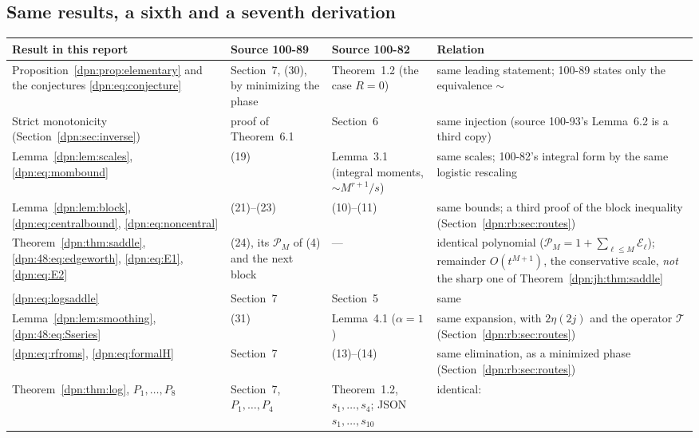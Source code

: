 \documentclass[11pt]{article}
\numberwithin{equation}{section}
\theoremstyle{definition}\newtheorem{definition}[theorem]{Definition}
\theoremstyle{remark}\newtheorem{remark}[theorem]{Remark}
\newcommand{\Top}{\mathcal T}
\begin{document}
\subsection{Same results, a sixth and a seventh derivation}\label{dpn:rb:sec:dup}
\begin{table}[!htbp]
\centering\small
\begin{tabular}{>{\raggedright\arraybackslash}p{3.7cm}>{\raggedright\arraybackslash}p{2.9cm}>{\raggedright\arraybackslash}p{2.9cm}>{\raggedright\arraybackslash}p{4.0cm}}
\toprule
Result in this report & Source 100-89 & Source 100-82 & Relation\\
\midrule
Proposition~\ref{dpn:prop:elementary} and the conjectures
 \eqref{dpn:eq:conjecture} & Section~7, (30), by minimizing the phase &
 Theorem~1.2 (the case $R=0$) & same leading statement; 100-89 states only
 the equivalence $\sim$\\
Strict monotonicity (Section~\ref{dpn:sec:inverse}) & proof of Theorem~6.1 &
 Section~6 & same injection (source 100-93's Lemma~6.2 is a third copy)\\
Lemma~\ref{dpn:lem:scales}, \eqref{dpn:eq:mombound} & (19) & Lemma~3.1
 (integral moments, $\sim M^{r+1}/s$) & same scales; 100-82's integral form
 by the same logistic rescaling\\
Lemma~\ref{dpn:lem:block}, \eqref{dpn:eq:centralbound},
 \eqref{dpn:eq:noncentral} & (21)--(23) & (10)--(11) & same bounds; a
 third proof of the block inequality (Section~\ref{dpn:rb:sec:routes})\\
Theorem~\ref{dpn:thm:saddle}, \eqref{dpn:48:eq:edgeworth}, \eqref{dpn:eq:E1},
 \eqref{dpn:eq:E2} & (24), its $\mathcal P_M$ of (4) and the next block & --- &
 identical polynomial ($\mathcal P_M=1+\sum_{\ell\le M}\mathcal E_\ell$);
 remainder $O(t^{M+1})$, the conservative scale, \emph{not} the sharp one of
 Theorem~\ref{dpn:jh:thm:saddle}\\
\eqref{dpn:eq:logsaddle} & Section~7 & Section~5 & same\\
Lemma~\ref{dpn:lem:smoothing}, \eqref{dpn:48:eq:Sseries} & (31) &
 Lemma~4.1 ($\alpha=1$) & same expansion, with $2\eta(2j)$ and the operator
 $\Top$ (Section~\ref{dpn:rb:sec:routes})\\
\eqref{dpn:eq:rfroms}, \eqref{dpn:eq:formalH} & Section~7 & (13)--(14) &
 same elimination, as a minimized phase (Section~\ref{dpn:rb:sec:routes})\\
Theorem~\ref{dpn:thm:log}, $P_1,\dots,P_8$ & Section~7, $P_1,\dots,P_4$ &
 Theorem~1.2, $s_1,\dots,s_4$; JSON $s_1,\dots,s_{10}$ & identical:

\end{tabular}
\end{table}
\end{document}
